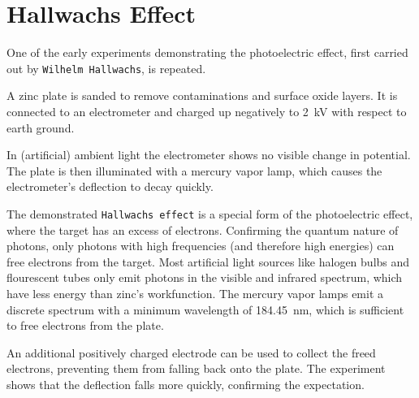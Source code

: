\chapter{Hallwachs Effect}

One of the early experiments demonstrating the photoelectric effect, first carried out by \texttt{Wilhelm Hallwachs}, is repeated.

A zinc plate is sanded to remove contaminations and surface oxide layers.
It is connected to an electrometer and charged up negatively to \SI{2}{\kV} with respect to earth ground.

In (artificial) ambient light the electrometer shows no visible change in potential.
The plate is then illuminated with a mercury vapor lamp, which causes the electrometer's deflection to decay quickly.

The demonstrated \texttt{Hallwachs effect} is a special form of the photoelectric effect, where the target has an excess of electrons.
Confirming the quantum nature of photons, only photons with high frequencies (and therefore high energies) can free electrons from the target.
Most artificial light sources like halogen bulbs and flourescent tubes only emit photons in the visible and infrared spectrum, which have less energy than zinc's workfunction.
The mercury vapor lamps emit a discrete spectrum with a minimum wavelength of \SI{184.45}{\nm}, which is sufficient to free electrons from the plate.

An additional positively charged electrode can be used to collect the freed electrons, preventing them from falling back onto the plate.
The experiment shows that the deflection falls more quickly, confirming the expectation.
